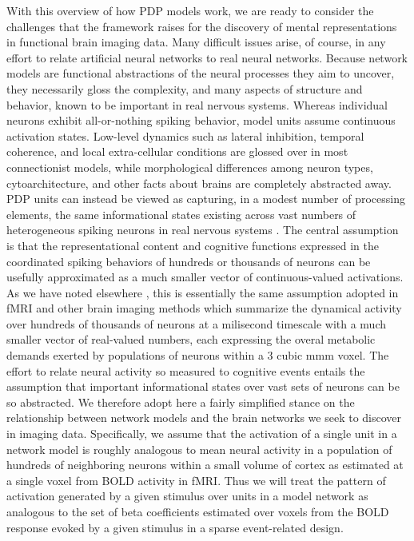 With this overview of how PDP models work, we are ready to consider the challenges that the framework raises for the discovery of mental representations in functional brain imaging data. Many difficult issues arise, of course, in any effort to relate artificial neural networks to real neural networks. Because network models are functional abstractions of the neural processes they aim to uncover, they necessarily gloss the complexity, and many aspects of structure and behavior, known to be important in real nervous systems. Whereas individual neurons exhibit all-or-nothing spiking behavior, model units assume continuous activation states. Low-level dynamics such as lateral inhibition, temporal coherence, and local extra-cellular conditions are glossed over in most connectionist models, while morphological differences among neuron types, cytoarchitecture, and other facts about brains are completely abstracted away. PDP units can instead be viewed as capturing, in a modest number of processing elements, the same informational states existing across vast numbers of heterogeneous spiking neurons in real nervous systems \cite{Smolensky86,RogersMcClelland2014}. The central assumption is that the representational content and cognitive functions expressed in the coordinated spiking behaviors of hundreds or thousands of neurons can be usefully approximated as a much smaller vector of continuous-valued activations. As we have noted elsewhere \cite{CoxSeidenbergRogersIP}, this is essentially the same assumption adopted in fMRI and other brain imaging methods which summarize the dynamical activity over hundreds of thousands of neurons at a milisecond timescale with a much smaller vector of real-valued numbers, each expressing the overal metabolic demands exerted by populations of neurons within a 3 cubic mmm voxel. The effort to relate neural activity so measured to cognitive events entails the assumption that important informational states over vast sets of neurons can be so abstracted. We therefore adopt here a fairly simplified stance on the relationship between network models and the brain networks we seek to discover in imaging data. Specifically, we assume that the activation of a single unit in a network model is roughly analogous to mean neural activity in a population of hundreds of neighboring neurons within a small volume of cortex as estimated at a single voxel from BOLD activity in fMRI. Thus we will treat the pattern of activation generated by a given stimulus over units in a model network as analogous to the set of beta coefficients estimated over voxels from the BOLD response evoked by a given stimulus in a sparse event-related design. 

